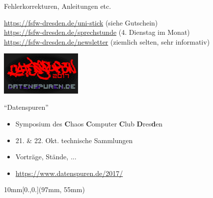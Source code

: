 \documentclass[t]{beamer}
\begin{document}
\begin{frame}[label=ct5]{\color{fg}{Weitere Informationen}}
 \vspace{6mm}
 Fehlerkorrekturen, Anleitungen etc.
 \vspace{6mm}
 
\url{https://fsfw-dresden.de/uni-stick} {\tiny(siehe Gutschein)}\\[3mm]

\url{https://fsfw-dresden.de/sprechstunde} {\tiny(4. Dienstag im Monat)}\\[3mm]
\url{https://fsfw-dresden.de/newsletter} {\tiny (ziemlich selten, sehr informativ)}


\end{frame}



\begin{frame}[label=ct6]{\color{fg}{Anschlusskommunikation (1)}}
 
 
 \begin{center}

 \includegraphics[width=4cm]{img-src/datenspuren}
  \end{center}
  
  
  "`Datenspuren"'
  \begin{itemize}
   \item Symposium des \textbf{C}haos \textbf{C}omputer \textbf{C}lub \textbf{D}res\textbf{d}en
   \item 21. \& 22. Okt. \pause technische Sammlungen
   \item Vorträge, Stände, ...
   \smallskip
   \item \url{https://www.datenspuren.de/2017/}
   
  \end{itemize}
  
  
  
\begin{textblock*}{10mm}[0.,0.](97mm, 55mm)
\end{textblock*}

  
 
\end{frame}
\end{document}
